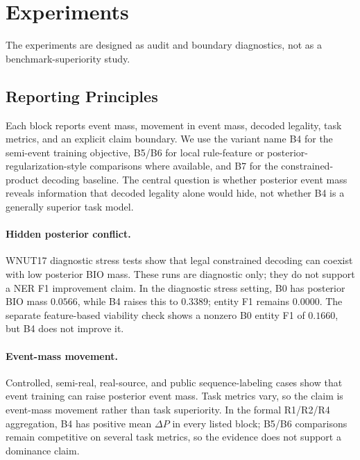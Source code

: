 \section{Experiments}

The experiments are designed as audit and boundary diagnostics, not as a
benchmark-superiority study.

\subsection{Reporting Principles}

Each block reports event mass, movement in event mass, decoded legality, task
metrics, and an explicit claim boundary.  We use the variant name B4 for the
semi-event training objective, B5/B6 for local rule-feature or
posterior-regularization-style comparisons where available, and B7 for the
constrained-product decoding baseline.  The central question is whether
posterior event mass reveals information that decoded legality alone would
hide, not whether B4 is a generally superior task model.

\paragraph{Hidden posterior conflict.}
WNUT17 diagnostic stress tests show that legal constrained decoding can coexist
with low posterior BIO mass.  These runs are diagnostic only; they do not
support a NER F1 improvement claim.  In the diagnostic stress setting, B0 has
posterior BIO mass \(0.0566\), while B4 raises this to \(0.3389\); entity F1
remains \(0.0000\).  The separate feature-based viability check shows a nonzero
B0 entity F1 of \(0.1660\), but B4 does not improve it.



\paragraph{Event-mass movement.}
Controlled, semi-real, real-source, and public sequence-labeling cases show
that event training can raise posterior event mass.  Task metrics vary, so the
claim is event-mass movement rather than task superiority.  In the formal
R1/R2/R4 aggregation, B4 has positive mean \(\Delta P\) in every listed block;
B5/B6 comparisons remain competitive on several task metrics, so the evidence
does not support a dominance claim.



